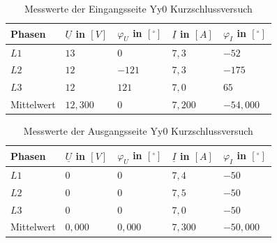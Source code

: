 \begin{enumerate}[label=\alph*)]
        \begin{table}[h!]
          \caption{Messwerte der Eingangsseite Yy0 Kurzschlussversuch}
          \centering
          \begin{tabular}{lllll}
            \\ \hline
            Phasen     & $\underline{U}$ in $[V]$ & $\varphi_{U}$ in $[^\circ]$ & $\underline{I}$ in $[A]$ & $\varphi_{I}$ in $[^\circ]$ \\ \hline
            $L1$       & $13$                     & $0$                         & $7,3$                    & $-52$                       \\
            $L2$       & $12$                     & $-121$                      & $7,3$                    & $-175$                      \\
            $L3$       & $12$                     & $121$                       & $7,0$                    & $65$                        \\ \hline
            Mittelwert & $12,300$                 & $0$                         & $7,200$                  & $-54,000$                   \\ \hline\hline
          \end{tabular}
        \end{table}
        \begin{table}[h!]
          \centering
          \caption{Messwerte der Ausgangsseite Yy0 Kurzschlussversuch}
          \begin{tabular}{lllll}
            \\ \hline
            Phasen     & $\underline{U}$ in $[V]$ & $\varphi_{U}$ in $[^\circ]$ & $\underline{I}$ in $[A]$ & $\varphi_{I}$ in $[^\circ]$ \\ \hline
            $L1$       & $0$                      & $0$                         & $7,4$                    & $-50$                       \\
            $L2$       & $0$                      & $0$                         & $7,5$                    & $-50$                       \\
            $L3$       & $0$                      & $0$                         & $7,0$                    & $-50$                       \\ \hline
            Mittelwert & $0,000$                  & $0,000$                     & $7,300$                  & $-50,000$                   \\ \hline\hline
          \end{tabular}
        \end{table}
\end{enumerate}

